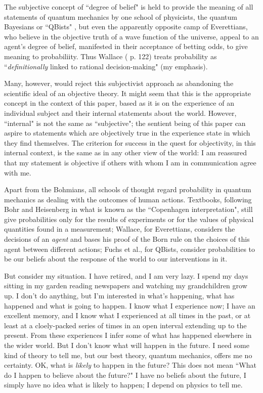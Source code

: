 \documentclass[12pt,reqno]{article}
\renewcommand{\(}{\left(}
\renewcommand{\)}{\right)}
\newcommand{\<}{\langle}
\renewcommand{\>}{\rangle}
\theoremstyle{plain} %
\begin{document}
The subjective concept of ``degree of belief" is held to provide the meaning of all statements of quantum mechanics by one school of physicists, the quantum Bayesians or ``QBists" \cite{QBism}, but even the apparently opposite camp of Everettians, who believe in the objective truth of a wave function of the universe, appeal to an agent's degree of belief, manifested in their acceptance of betting odds, to give meaning to probabiliity. Thus Wallace (\cite{Wallace:multiverse} p. 122) treats probability as ``\emph{definitionally} linked to rational decision-making" (my emphasis). 

Many, however, would reject this subjectivist approach as abandoning the scientific ideal of an objective theory. It might seem that this is the appropriate concept in the context of this paper, based as it is on the experience of an individual subject and their internal statements about the world. However, ``internal" is not the same as ``subjective"; the sentient being of this paper can aspire to statements which are objectively true in the experience state in which they find themselves. The criterion for success in the quest for objectivity, in this internal context, is the same as in any other view of the world: I am reassured that my statement is objective if others with whom I am in communication agree with me.

Apart from the Bohmians, all schools of thought regard probability in quantum mechanics as dealing with the outcomes of human actions. Textbooks, following Bohr and Heisenberg in what is known as the ``Copenhagen interpretation", still give probabilities only for the results of experiments or for the values of physical quantities found in a measurement; Wallace, for Everettians, considers the decisions of an \emph{agent} and bases his proof of the Born rule on the choices of this agent between different actions; Fuchs et al., for QBists, consider probabilities to be our beliefs about the response of the world to our interventions in it.

But consider my situation. I have retired, and I am very lazy. I spend my days sitting in my garden reading newspapers and watching my grandchildren grow up. I don't do anything, but I'm interested in what's happening, what has happened and what is going to happen. I know what I experience now; I have an excellent memory, and I know what I experienced at all times in the past, or at least at a cloely-packed series of times in an open interval extending up to the present. From these experiences I infer some of what has happened elsewhere in the wider world. But I don't know what will happen in the future. I need some kind of theory to tell me, but our best theory, quantum mechanics, offers me no certainty. OK, what is \emph{likely} to happen in the future? This does not mean ``What do I happen to believe about the future?" I have no beliefs about the future, I simply have no idea what is likely to happen; I depend on physics to tell me.
\end{document}
